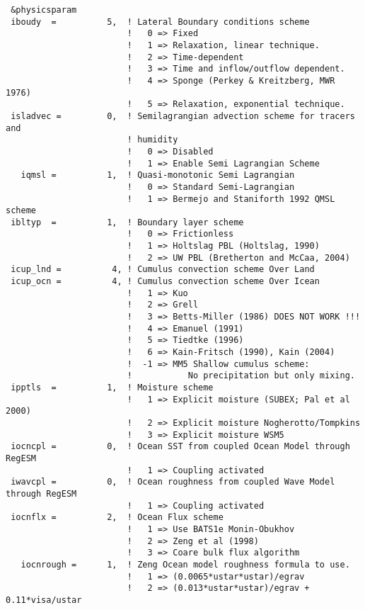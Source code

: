 {\footnotesize
\begin{Verbatim}
 &physicsparam
 iboudy  =          5,  ! Lateral Boundary conditions scheme
                        !   0 => Fixed
                        !   1 => Relaxation, linear technique.
                        !   2 => Time-dependent
                        !   3 => Time and inflow/outflow dependent.
                        !   4 => Sponge (Perkey & Kreitzberg, MWR 1976)
                        !   5 => Relaxation, exponential technique.
 isladvec =         0,  ! Semilagrangian advection scheme for tracers and
                        ! humidity
                        !   0 => Disabled
                        !   1 => Enable Semi Lagrangian Scheme
   iqmsl =          1,  ! Quasi-monotonic Semi Lagrangian
                        !   0 => Standard Semi-Lagrangian
                        !   1 => Bermejo and Staniforth 1992 QMSL scheme
 ibltyp  =          1,  ! Boundary layer scheme
                        !   0 => Frictionless
                        !   1 => Holtslag PBL (Holtslag, 1990)
                        !   2 => UW PBL (Bretherton and McCaa, 2004)
 icup_lnd =          4, ! Cumulus convection scheme Over Land
 icup_ocn =          4, ! Cumulus convection scheme Over Icean
                        !   1 => Kuo
                        !   2 => Grell
                        !   3 => Betts-Miller (1986) DOES NOT WORK !!!
                        !   4 => Emanuel (1991)
                        !   5 => Tiedtke (1996)
                        !   6 => Kain-Fritsch (1990), Kain (2004)
                        !  -1 => MM5 Shallow cumulus scheme:
                        !           No precipitation but only mixing.
 ipptls  =          1,  ! Moisture scheme
                        !   1 => Explicit moisture (SUBEX; Pal et al 2000)
                        !   2 => Explicit moisture Nogherotto/Tompkins
                        !   3 => Explicit moisture WSM5
 iocncpl =          0,  ! Ocean SST from coupled Ocean Model through RegESM
                        !   1 => Coupling activated
 iwavcpl =          0,  ! Ocean roughness from coupled Wave Model through RegESM
                        !   1 => Coupling activated
 iocnflx =          2,  ! Ocean Flux scheme
                        !   1 => Use BATS1e Monin-Obukhov
                        !   2 => Zeng et al (1998)
                        !   3 => Coare bulk flux algorithm
   iocnrough =      1,  ! Zeng Ocean model roughness formula to use.
                        !   1 => (0.0065*ustar*ustar)/egrav
                        !   2 => (0.013*ustar*ustar)/egrav + 0.11*visa/ustar

\end{Verbatim}}
